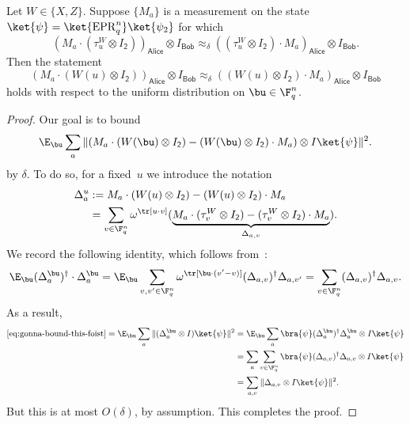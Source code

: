 \documentclass[11pt]{article}
\newcommand{\reg}[1]{{\mathsf{#1}}}
\begin{document}
\begin{lemma}\label{lem:proj-to-obs}
Let $W \in \{X, Z\}$.
Suppose $\{M_{a}\}$ is a measurement on the state $\ket{\psi} = \ket{\mathrm{EPR}_q^n} \ket{\psi_2}$ for which
\begin{equation*}
(M_{a} \cdot (\tau^{W}_{u} \otimes I_{\reg{2}}))_{\reg{Alice}} \otimes I_{\reg{Bob}}
\approx_{\delta} ((\tau^{W}_{u} \otimes I_{\reg{2}}) \cdot M_{a})_{\reg{Alice}} \otimes I_{\reg{Bob}}.
\end{equation*}
Then the statement
\begin{equation*}
(M_{a} \cdot (W(u) \otimes I_{\reg{2}}))_{\reg{Alice}} \otimes I_{\reg{Bob}}
\approx_{\delta} ((W(u) \otimes I_{\reg{2}}) \cdot M_{a})_{\reg{Alice}} \otimes I_{\reg{Bob}}
\end{equation*}
holds with respect to the uniform distribution on $\bu \in \F_q^n$.
\end{lemma}
\begin{proof}
Our goal is to bound
\begin{equation}\label{eq:gonna-bound-this-foist}
\E_{\bu} \sum_{a} \Vert (M_{a} \cdot (W(\bu) \otimes I_{\reg{2}}) - (W(\bu) \otimes I_{\reg{2}}) \cdot M_{a}) \otimes I \ket{\psi} \Vert^2.
\end{equation}
by $\delta$.
To do so, for a fixed~$u$ we introduce the notation
\begin{align}
\Delta_{a}^{u}
&:= M_{a} \cdot (W(u) \otimes I_{\reg{2}}) - (W(u) \otimes I_{\reg{2}}) \cdot M_{a}\nonumber\\
&= \sum_{v \in \F_q^n} \omega^{\tr[u \cdot v]} (\underbrace{M_{a}
	\cdot (\tau^{W}_{v} \otimes I_{\reg{2}})- (\tau^{W}_v \otimes I_{\reg{2}}) \cdot M_{a}}_{\Delta_{a,v}}).\label{eq:pauli-obs-commutator-foist}
\end{align}
We record the following identity, which follows from~:
\begin{equation*}
\E_{\bu} (\Delta_{a}^{\bu})^\dagger\cdot \Delta_{a}^{\bu}
= \E_{\bu} \sum_{v, v' \in \F_q^n} \omega^{\tr[\bu \cdot (v' - v)]} (\Delta_{a,v})^\dagger \Delta_{a,v'}
= \sum_{v \in \F_q^n} (\Delta_{a,v})^\dagger \Delta_{a,v}.
\end{equation*}
As a result,
\begin{align*}
\eqref{eq:gonna-bound-this-foist}=
\E_{\bu} \sum_{a}\Vert (\Delta_{a}^{\bu} \otimes I) \ket{\psi}\Vert^2
&= \E_{\bu} \sum_{a} \bra{\psi} (\Delta_{a}^{\bu})^\dagger \Delta_{a}^{\bu} \otimes I \ket{\psi}\\
&=  \sum_{a} \sum_{v \in \F_q^n} \bra{\psi}(\Delta_{a,v})^\dagger \Delta_{a,v} \otimes I \ket{\psi}\\
&= \sum_{a, v} \Vert \Delta_{a,v} \otimes I \ket{\psi} \Vert^2.
\end{align*}
But this is at most $O(\delta)$, by assumption. This completes the proof.
\end{proof}
\end{document}
